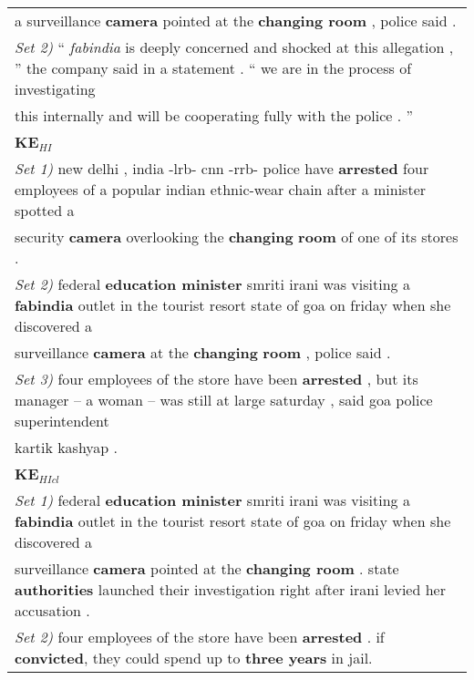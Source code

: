 \begin{table*}[th]
\begin{center}
{\begin{tabular}{|l|}
 				a surveillance \textbf{camera} pointed at the \textbf{changing room} ,
 				police said . \\
 				\textit{Set 2)} `` \textit{fabindia} is deeply concerned and shocked at this allegation , 
 				'' the company said in a statement . `` we are in the process of investigating\\
 				this internally and will be cooperating fully with the police . '' \\
 				\hline \bf KE$_{HI}$ \\
 				\hline \textit{Set 1)} new delhi , india -lrb- cnn -rrb- police have \textbf{arrested}
 				four employees of a popular indian ethnic-wear chain after a minister spotted 
 				a \\security \textbf{camera} overlooking the \textbf{changing} \textbf{room} of one of
 				its stores . \\
 				\textit{Set 2)} federal \textbf{education minister} 
 				smriti irani was visiting a  \textbf{fabindia} outlet in the tourist 
 				resort state of goa on friday when she discovered a \\surveillance
 				\textbf{camera} at the \textbf{changing} \textbf{room} , police said .\\
 				\textit{Set 3)} four employees of the store have been \textbf{arrested} , 
 				but its manager -- a woman -- was still at large saturday , 
 				said goa police superintendent \\kartik kashyap . \\
 				\hline \bf KE$_{HIcl}$ \\
 				\hline \textit{Set 1)} federal \textbf{education minister} smriti irani was
 				visiting a \textbf{fabindia} outlet in the tourist resort state of 
 				goa on friday when she discovered a \\surveillance \textbf{camera} pointed 
 				at the \textbf{changing room} . state \textbf{authorities} launched their 
 				investigation right after irani levied her accusation .\\
 				\textit{Set 2)} four employees of the store have been \textbf{arrested} .
 				if \textbf{convicted}, they could spend up to \textbf{three years} in jail. \\
 				\hline
 			\end{tabular}
 		}
\end{center}
\end{table*}
